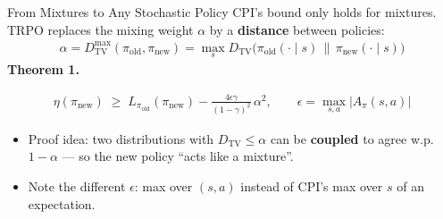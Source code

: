\documentclass[aspectratio=169]{beamer}
\newcommand{\DTV}{D_{\mathrm{TV}}}
\newcommand{\piold}{\pi_{\mathrm{old}}}
\newcommand{\pinew}{\pi_{\mathrm{new}}}
\begin{document}
\begin{frame}{From Mixtures to Any Stochastic Policy}
  CPI's bound only holds for mixtures. TRPO replaces the mixing weight $\alpha$ by a \textbf{distance} between policies:
  \begin{gather*}
    \alpha = \DTV^{\max}(\piold,\pinew) = \max_s \DTV\big(\piold(\cdot\mid s)\,\|\,\pinew(\cdot\mid s)\big)
  \end{gather*}
  \textbf{Theorem 1.}
  \begin{formulabox}
    \begin{gather*}
      \eta(\pinew) \;\ge\; L_{\piold}(\pinew) - \frac{4\epsilon\gamma}{(1-\gamma)^2}\,\alpha^2,
    \qquad \epsilon = \max_{s,a}|A_\pi(s,a)|
    \end{gather*}
  \end{formulabox}
  \begin{itemize}
    \item Proof idea: two distributions with $\DTV \le \alpha$ can be \textbf{coupled} to agree w.p.\ $1-\alpha$ --- so the new policy ``acts like a mixture''.
    \item Note the different $\epsilon$: max over $(s,a)$ instead of CPI's max over $s$ of an expectation.
  \end{itemize}
\end{frame}
\end{document}
